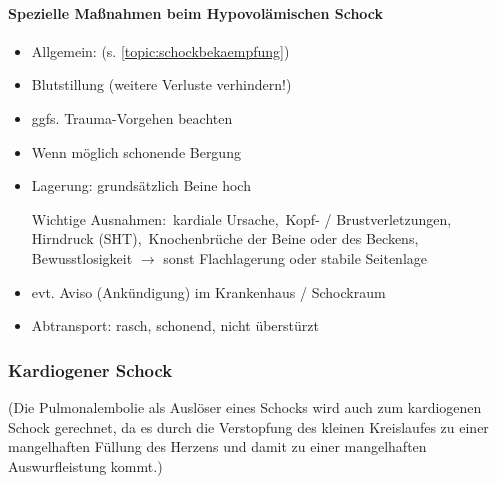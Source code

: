 \begin{gMassnahmenEnv}
    \paragraph{Spezielle Ma{\ss}nahmen beim Hypovolämischen
    Schock}
    
    \begin{itemize}
        \item Allgemein:  (s.
        \ref{topic:schockbekaempfung})
        \item Blutstillung  (weitere Verluste verhindern!)
        \item ggfs. Trauma-Vorgehen beachten
        \item Wenn m\"oglich schonende Bergung
        \item Lagerung: grunds\"atzlich Beine hoch
        
        Wichtige Ausnahmen: {\textperiodcentered}\,kardiale Ursache,
        {\textperiodcentered}\,Kopf- / Brust\-ver\-letzungen,
        {\textperiodcentered}\,Hirndruck (SHT),
        {\textperiodcentered}\,Knochenbr\"uche der Beine oder des
        Beckens, {\textperiodcentered}\,Bewusstlosigkeit
        ${\rightarrow}$ sonst Flachlagerung oder stabile Seitenlage
        \item evt. Aviso (Ank\"undigung) im  Krankenhaus / Schockraum
        \item Abtransport: rasch, schonend, nicht \"uberst\"urzt
    \end{itemize}
\end{gMassnahmenEnv}



\subsubsection{Kardiogener Schock}
(Die Pulmonalembolie als Auslöser eines Schocks wird auch
zum kardiogenen Schock gerechnet, da es durch die
Verstopfung des kleinen Kreislaufes zu einer mangelhaften
Füllung des Herzens und damit zu einer mangelhaften
Auswurfleistung kommt.)

